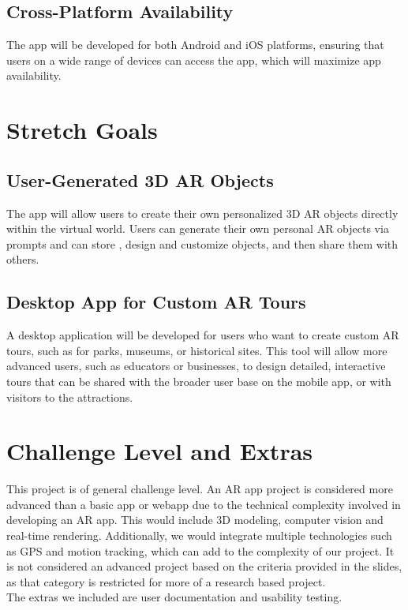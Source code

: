 \documentclass{article}
\begin{document}
\subsection{Cross-Platform Availability}
The app will be developed for both Android and iOS platforms, ensuring that users on a wide range of devices can access the app, which will maximize app availability.

\section{Stretch Goals}

\subsection{User-Generated 3D AR Objects}
The app will allow users to create their own personalized 3D AR objects directly within the virtual world. Users can generate their own personal AR objects via prompts and can store , design and customize objects, and then share them with others.

\subsection{Desktop App for Custom AR Tours}
A desktop application will be developed for users who want to create custom AR tours, such as for parks, museums, or historical sites. This tool will allow more advanced users, such as educators or businesses, to design detailed, interactive tours that can be shared with the broader user base on the mobile app, or with visitors to the attractions.

\section{Challenge Level and Extras}

This project is of general challenge level. An AR app project is considered more advanced than a basic app or webapp due to the technical complexity involved in developing an AR app. This would include 3D modeling, computer vision and real-time rendering. Additionally, we would integrate multiple technologies such as GPS and motion tracking, which can add to the complexity of our project. It is not considered an advanced project based on the criteria provided in the slides, as that category is restricted for more of a research based project.\\

The extras we included are user documentation and usability testing.\\
\end{document}
